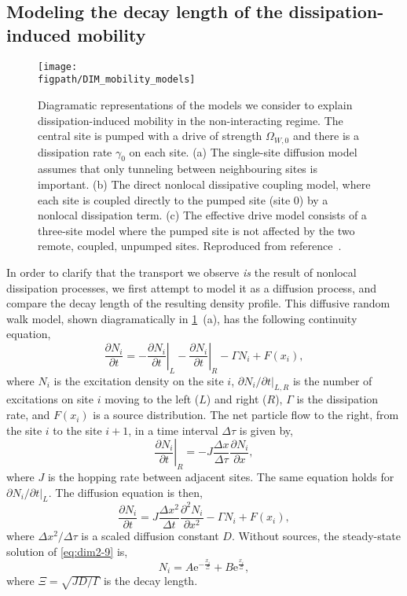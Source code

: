 \subsection{Modeling the decay length of the dissipation-induced mobility}
\begin{figure}[ht!]
\centering
\texttt{[image: \\figpath/DIM\_mobility\_models]}
\caption{\label{fig:dim2-4}Diagramatic representations of the models we consider to explain dissipation-induced mobility in the non-interacting regime. The central site is pumped with a drive of strength \(\Omega_{W,0}\) and there is a dissipation rate \(\gamma_{0}\) on each site. (a) The single-site diffusion model assumes that only tunneling between neighbouring sites is important. (b) The direct nonlocal dissipative coupling model, where each site is coupled directly to the pumped site (site 0) by a nonlocal dissipation term. (c) The effective drive model consists of a three-site model where the pumped site is not affected by the two remote, coupled, unpumped sites. Reproduced from reference~\cite{Owen2017}.}
\end{figure}
In order to clarify that the transport we observe \emph{is} the result of nonlocal dissipation processes, we first attempt to model it as a diffusion process, and compare the decay length of the resulting density profile. This diffusive random walk model, shown diagramatically in \cref{fig:dim2-4}~(a), has the following continuity equation,
\begin{equation}
	\frac{\partial N_{i}}{\partial t} = - \left.\frac{\partial N_{i}}{\partial t}\right|_{L} - \left.\frac{\partial N_{i}}{\partial t}\right|_{R} - \Gamma N_{i} + F(x_{i}),
	\label{eq:dim2-7}
\end{equation}
where \(N_{i}\) is the excitation density on the site \(i\), \(\partial N_{i} / \partial t|_{L,R}\) is the number of excitations on site \(i\) moving to the left (\(L\)) and right (\(R\)), \(\Gamma\) is the dissipation rate, and \(F(x_{i})\) is a source distribution. The net particle flow to the right, from the site \(i\) to the site \(i+1\), in a time interval \(\Delta \tau\) is given by,
\begin{equation}
	\left.\frac{\partial N_{i}}{\partial t}\right|_{R} = -J\frac{\Delta x}{\Delta \tau}\frac{\partial N_{i}}{\partial x},
	\label{eq:dim2-8}
\end{equation}
where \(J\) is the hopping rate between adjacent sites. The same equation holds for \(\partial N_{i}/\partial t|_{L}\). The diffusion equation is then,
\begin{equation}
	\frac{\partial N_{i}}{\partial t} = J\frac{\Delta x^{2}}{\Delta t}\frac{\partial^{2} N_{i}}{\partial x^{2}} - \Gamma N_{i} + F(x_{i}),
	\label{eq:dim2-9}
\end{equation}
where \(\Delta x^{2}/\Delta \tau\) is a scaled diffusion constant \(D\). Without sources, the steady-state solution of \cref{eq:dim2-9} is,
\begin{equation}
	N_{i} = A\mathrm{e}^{-\frac{x_{i}}{\Xi}} + B\mathrm{e}^{\frac{x_{i}}{\Xi}},
	\label{eq:dim2-10}
\end{equation}
where \(\Xi = \sqrt{JD/\Gamma}\) is the decay length.

